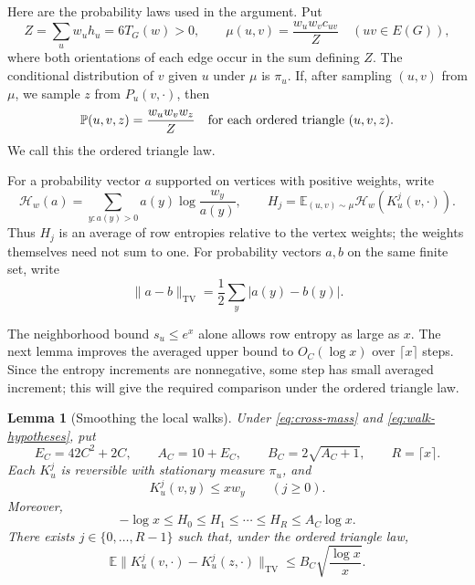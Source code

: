 \documentclass[11pt]{article}
\newtheorem{lemma}[theorem]{Lemma}
\theoremstyle{definition}
\theoremstyle{remark}
\numberwithin{equation}{section}
\begin{document}
Here are the probability laws used in the argument.  Put
\[
 Z=\sum_u w_uh_u=6T_G(w)>0,
 \qquad \mu(u,v)=\frac{w_uw_vc_{uv}}{Z}\quad(uv\in E(G)),
\]
where both orientations of each edge occur in the sum defining $Z$.
The conditional distribution of $v$ given $u$ under $\mu$ is $\pi_u$.
If, after sampling $(u,v)$ from $\mu$, we sample $z$ from $P_u(v,\cdot)$,
then
\begin{equation}
 \mathbb P(u,v,z)=\frac{w_uw_vw_z}{Z}
 \quad\hbox{for each ordered triangle $(u,v,z)$}.
 \label{eq:ordered-triangle-law}
\end{equation}
We call this the ordered triangle law.

For a probability vector $a$ supported on vertices with positive weights,
write
\[
 \mathcal H_w(a)=\sum_{y:a(y)>0}a(y)\log\frac{w_y}{a(y)},\qquad
 H_j=\mathbb E_{(u,v)\sim\mu}\mathcal H_w(K_u^j(v,\cdot)).
\]
Thus $H_j$ is an average of row entropies relative to the vertex weights;
the weights themselves need not sum to one.  For probability vectors $a,b$
on the same finite set, write
\[
 \|a-b\|_{\mathrm{TV}}=\frac12\sum_y|a(y)-b(y)|.
\]

The neighborhood bound $s_u\le e^x$ alone allows row entropy as large
as $x$.  The next lemma improves the averaged upper bound to
$O_C(\log x)$ over $\lceil x\rceil$ steps.  Since the entropy increments
are nonnegative, some step has small averaged increment; this will give
the required comparison under the ordered triangle law.

\begin{lemma}[Smoothing the local walks]
\label{lem:entropy-smoothing}
Under \eqref{eq:cross-mass} and \eqref{eq:walk-hypotheses}, put
\[
 E_C=42C^2+2C,\qquad A_C=10+E_C,\qquad B_C=2\sqrt{A_C+1},
 \qquad R=\lceil x\rceil.
\]
Each $K_u^j$ is reversible with stationary measure $\pi_u$, and
\begin{equation}
 K_u^j(v,y)\le xw_y\qquad(j\ge0).
 \label{eq:walk-density}
\end{equation}
Moreover,
\begin{equation}
 -\log x\le H_0\le H_1\le\cdots\le H_R\le A_C\log x.
 \label{eq:entropy-upper}
\end{equation}
There exists $j\in\{0,\ldots,R-1\}$ such that, under the ordered triangle
law,
\begin{equation}
 \mathbb E\bigl\|K_u^j(v,\cdot)-K_u^j(z,\cdot)\bigr\|_{\mathrm{TV}}
 \le B_C\sqrt{\frac{\log x}{x}}.
 \label{eq:triangle-row-distance}
\end{equation}
\end{lemma}
\end{document}
